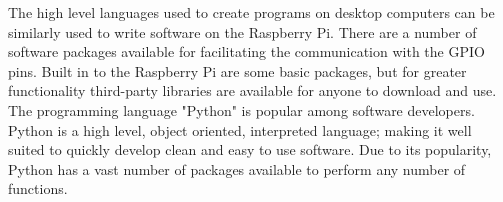\documentclass[a4]{report}
\begin{document}
	The high level languages used to create programs on desktop computers can be similarly used to write software on the Raspberry Pi. There are a number of software packages available for facilitating the communication with the GPIO pins. Built in to the Raspberry Pi are some basic packages, but for greater functionality third-party libraries are available for anyone to download and use\cite{pilibswiringpi, pilibspigpio}. The programming language "Python" is popular among software developers. Python is a high level, object oriented, interpreted language; making it well suited to quickly develop clean and easy to use software. Due to its popularity, Python has a vast number of packages available to perform any number of functions. \newline \newline \noindent
\end{document}
